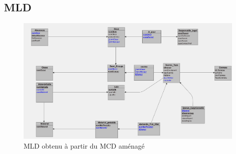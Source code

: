 \documentclass[12pt,french,titlepage]{article}
\begin{document}
	  \subsection{MLD}
	  
	  \begin{figure}[H]
	      \centering
	      \includegraphics[scale=0.1]{./mld_amenage.jpg}
	      \caption{MLD obtenu à partir du MCD aménagé}
	      
	   
	      
	  \end{figure}
	  
    

	
	
	
\end{document}
